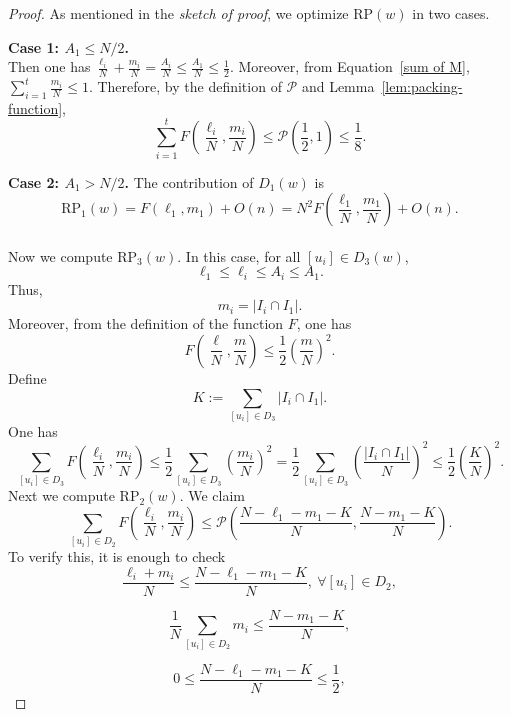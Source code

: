 \documentclass[runningheads,envcountsame,a4paper]{llncs}
\newcommand{\rp}{\mathrm{RP}}
\begin{document}
\begin{proof}
As mentioned in the {\em sketch of proof}, we optimize $\rp(w)$ in two cases.

\noindent
\textbf{Case 1: \(A_1\le N/2\).}\\
Then one has
\(
\frac{\ell_i}{N}+\frac{m_i}{N}=\frac{A_i}{N}\le \frac{A_1}{N}\le\frac12.
\)
Moreover, from Equation~\ref{sum of M}, $\sum_{i=1}^t \frac{m_i}{N}\le 1$. Therefore, by the definition of \(\mathcal P\) and Lemma~\ref{lem:packing-function},
\[
\sum_{i=1}^t F(\frac{\ell_i}{N},\frac{m_i}{N})
\le
\mathcal P\left(\frac12,1\right)\le \frac18.
\]

\medskip

\noindent
\textbf{Case 2: \(A_1>N/2\).}
The contribution of $D_1(w)$ is
\[
\rp_1(w)=F(\ell_1,m_1)+O(n)=N^2F(\frac{\ell_1}{N},\frac{m_1}{N})+O(n).
\]\\
Now we compute $\rp_3(w)$. In this case, for all $[u_i] \in D_3(w)$, $$\ell_1 \le \ell_i \le A_i \le A_1.$$ Thus, $$m_i=|I_i \cap I_1|.$$ Moreover, from the definition of the function $F$, one has $$F(\frac{\ell}{N},\frac{m}{N})\le \frac12 \left(\frac{m}{N}\right)^2.$$
Define
\[
K:=\sum_{[u_i]\in D_3}|I_i\cap I_1|.
\]
One has
\[
\sum_{[u_i]\in D_3}F(\frac{\ell_i}{N},\frac{m_i}{N})
\le
\frac12\sum_{[u_i]\in D_3}\left(\frac{m_i}{N}\right)^2
=
\frac12\sum_{[u_i]\in D_3}\left(\frac{|I_i\cap I_1|}{N}\right)^2
\le
\frac12\left(\frac{K}{N}\right)^2.
\]
Next we compute $\rp_2(w)$. We claim
\[
\sum_{[u_i]\in D_2}F(\frac{\ell_i}{N},\frac{m_i}{N})
\le
\mathcal P(\frac{N-\ell_1-m_1-K}{N},\frac{N-m_1-K}{N}).
\]
To verify this, it is enough to check
\begin{equation}\label{eq:cond-li-mi}
    \frac{\ell_i+m_i}{N}
    \le
    \frac{N-\ell_1-m_1-K}{N},\ \forall [u_i]\in D_2,
\end{equation}

\begin{equation}\label{eq:cond-sum-mi}
    \frac1N\sum_{[u_i]\in D_2} m_i
    \le
    \frac{N-m_1-K}{N},
\end{equation}

\begin{equation}\label{eq:cond-half}
    0
    \le
    \frac{N-\ell_1-m_1-K}{N}
    \le
    \frac{1}{2},
\end{equation}


\end{proof}
\end{document}
